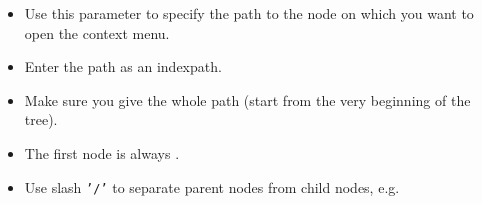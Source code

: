 
\begin{itemize}
\item Use this parameter to specify the path to the node on which you want to open the context menu.
\item Enter the path as an indexpath.
\item Make sure you give the whole path (start from the very beginning of the tree).
\item The first node is always . 
\item Use slash {\tt '/'} to separate parent nodes from child nodes, e.g. 
\end{itemize}  

